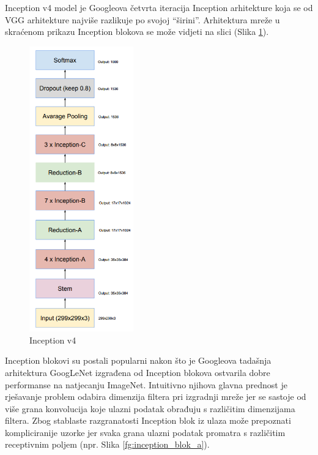 \documentclass[times, utf8, proizvoljni, numeric]{fer}
\begin{document}
Inception v4 model je Googleova četvrta iteracija Inception arhitekture koja se od VGG arhitekture najviše razlikuje po svojoj “širini”.  Arhitektura mreže u skraćenom prikazu Inception blokova se može vidjeti na slici (Slika \ref{fg:inceptionv4}). 

\begin{figure}[!ht]
	\begin{center}
		\captionsetup{justification=centering}
		\includegraphics[width=0.4\textwidth]{./imgs/inceptionv4.png}
		\caption{Inception v4 \cite{Inceptionv4}}
		\label{fg:inceptionv4}
	\end{center}
\end{figure}

Inception blokovi su postali popularni nakon što je Googleova tadašnja arhitektura GoogLeNet izgrađena od Inception blokova ostvarila dobre performanse na natjecanju ImageNet. Intuitivno njihova glavna prednost je rješavanje problem odabira dimenzija filtera pri izgradnji mreže jer se sastoje od više grana konvolucija koje ulazni podatak obrađuju s različitim dimenzijama filtera. Zbog stablaste razgranatosti Inception blok iz ulaza može prepoznati kompliciranije uzorke jer svaka grana ulazni podatak promatra s različitim receptivnim poljem (npr. Slika \ref{fg:inception_blok_a}).
	
\end{document}
